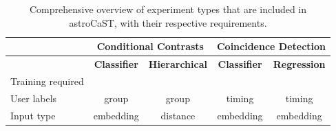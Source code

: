 \documentclass[utf8]{FrontiersinHarvard}
\newcommand{\cmark}{\ding{51}} %
\newcommand{\xmark}{\textemdash} %
\begin{document}
    \bgroup
    \def\arraystretch{1.5}
    \begin{table}[htb]
        \centering
        \caption{Comprehensive overview of experiment types that are included in astroCaST, with their respective requirements.\newline}
        \label{tab:experiments}
        \begin{tabular}{|l|c|c|c|c|}
            \hline
            & \multicolumn{2}{c|}{\textbf{Conditional Contrasts}} & \multicolumn{2}{c|}{\textbf{Coincidence Detection}} \\ \hline
            & \textbf{Classifier} & \textbf{Hierarchical} & \textbf{Classifier} & \textbf{Regression} \\ \hline
            Training required & \cmark              & \xmark                & \cmark              & \cmark              \\ \hline
            User labels       & group               & group                 & timing              & timing              \\ \hline
            Input type        & embedding           & distance              & embedding           & embedding           \\ \hline
        \end{tabular}
    \end{table}
    \egroup
\end{document}

